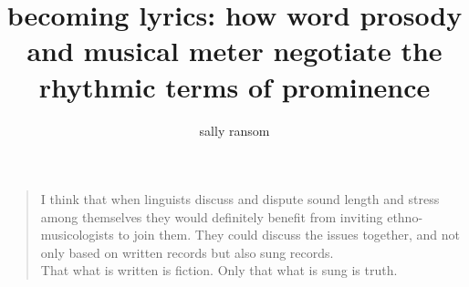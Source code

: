 \documentclass[12pt]{report}	%
\author{sally ransom}  	%
\title{becoming lyrics: how word prosody and musical meter negotiate the rhythmic terms of prominence}
\theoremstyle{plain} %
\theoremstyle{definition}
\theoremstyle{remark}
\numberwithin{equation}{section}
\begin{document}
\copyrightpage          %


%
%

\titlepage              %
%
\commcertpage           %





%
\begin{dedication}
%

\begin{quotation}
{\scriptsize I think that when linguists discuss and dispute sound length and stress among themselves they would definitely benefit from inviting ethno-musicologists to join them. They could discuss the issues together, and not only based on written records but also sung records. \\ 
That what is written is fiction. Only that what is sung is truth. \\
\cite{tormis2007} }



\end{quotation}

\end{dedication}


\end{document}
